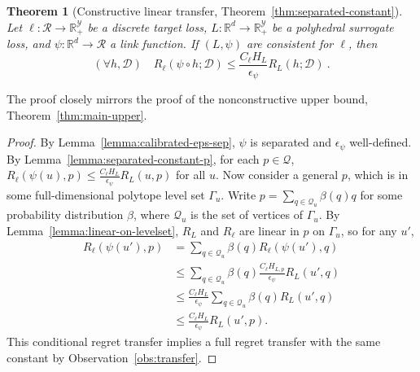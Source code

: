 \documentclass{article}
\newtheorem*{theorem*}{Theorem}
\theoremstyle{definition}\newtheorem{definition}{Definition}
\theoremstyle{definition}\newtheorem{assumption}{Assumption}
\newcommand{\reals}{\mathbb{R}}
\newcommand{\D}{\mathcal{D}}
\newcommand{\R}{\mathcal{R}}
\newcommand{\Y}{\mathcal{Y}}
\begin{document}
\begin{theorem*}[Constructive linear transfer, Theorem~\ref{thm:separated-constant}]
  Let $\ell: \R \to \reals_+^{\Y}$ be a discrete target loss, $L: \reals^d \to \reals_+^{\Y}$ be a polyhedral surrogate loss, and $\psi: \reals^d \to \R$ a link function.
  If $(L,\psi)$ are consistent for $\ell$, then
    \[ (\forall h,\D) \quad R_{\ell}(\psi \circ h ; \D) \leq \frac{C_{\ell} H_L}{\epsilon_{\psi}} R_L(h ; \D) ~. \]
\end{theorem*}
The proof closely mirrors the proof of the nonconstructive upper bound, Theorem~\ref{thm:main-upper}.
\begin{proof}
  By Lemma~\ref{lemma:calibrated-eps-sep}, $\psi$ is separated and $\epsilon_{\psi}$ well-defined.
  By Lemma~\ref{lemma:separated-constant-p}, for each $p \in \mathcal{Q}$, $R_{\ell}(\psi(u),p) \leq \frac{C_{\ell} H_L}{\epsilon_{\psi}} R_L(u,p)$ for all $u$.
  Now consider a general $p$, which is in some full-dimensional polytope level set $\Gamma_u$.
  Write $p = \sum_{q \in \mathcal{Q}_u} \beta(q) q$ for some probability distribution $\beta$, where $\mathcal{Q}_u$ is the set of vertices of $\Gamma_u$.
  By Lemma~\ref{lemma:linear-on-levelset}, $R_L$ and $R_{\ell}$ are linear in $p$ on $\Gamma_u$, so for any $u'$,
  \begin{align*}
    R_{\ell}(\psi(u'),p)
    &=    \sum_{q \in \mathcal{Q}_u} \beta(q) R_{\ell}(\psi(u'), q)  \\
    &\leq \sum_{q \in \mathcal{Q}_u} \beta(q) \frac{C_{\ell} H_{L,p}}{\epsilon_{\psi}} R_L(u', q)  \\
    &\leq \frac{C_{\ell} H_L}{\epsilon_{\psi}} \sum_{q \in \mathcal{Q}_u} \beta(q) R_L(u', q)  \\
    &\leq \frac{C_{\ell} H_L}{\epsilon_{\psi}} R_L(u', p) .
  \end{align*}
  This conditional regret transfer implies a full regret transfer with the same constant by Observation~\ref{obs:transfer}.
\end{proof}





%
%
%
%
%
%
%
\end{document}
